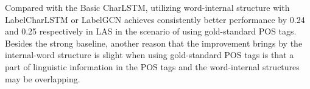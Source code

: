 

Compared with the Basic CharLSTM, utilizing word-internal structure with LabelCharLSTM or LabelGCN achieves consistently better performance by 0.24 and 0.25 respectively in LAS in the scenario of using gold-standard POS tags.
Besides the strong baseline, another reason that the improvement brings by the internal-word structure is slight when using gold-standard POS tags is that a part of linguistic information in the POS tags and the word-internal structures may be overlapping.







